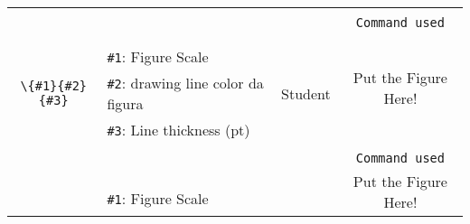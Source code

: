 \documentclass{article}
\begin{document}
\begin{table}[H]
\begin{tabular}{|c|l|c|c|}
                                            &
                                            &
                                            \\
                                            &
                                            &
                                            &
\verb|Command used|                    \\
\hline %
                                            & 
                                            & 
                                            &
\multirow{5}{*}{Put the Figure Here!}     \\
                                            &
                                            & 
                                            & 
                                            \\
                                            &
\verb|#1|: Figure Scale                 &
                                            &
                                            \\
\verb|\{#1}{#2}{#3}|                &
\verb|#2|: drawing line color da figura                 &
Student                        &
                                            \\
                                            &
\verb|#3|: Line thickness (pt)                 &
                                            &
                                            \\
                                            &
                                            &
                                            &
                                            \\
                                            &
                                            &
                                            &
\verb|Command used|                    \\
\hline %
                                            & 
                                            & 
                                            &
\multirow{5}{*}{Put the Figure Here!}     \\
                                            &
                                            & 
                                            & 
                                            \\
                                            &
\verb|#1|: Figure Scale                 &
                                            &
                                            \\

\end{tabular}
\end{table}
\end{document}
